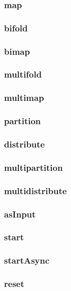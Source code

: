 \documentclass{article}
\begin{document}
\subsubsection{map}
\subsubsection{bifold}
\subsubsection{bimap}
\subsubsection{multifold}
\subsubsection{multimap}
\subsubsection{partition}
\subsubsection{distribute}
\subsubsection{multipartition}
\subsubsection{multidistribute}
\subsubsection{asInput}
\subsubsection{start}
\subsubsection{startAsync}
\subsubsection{reset}
\end{document}
